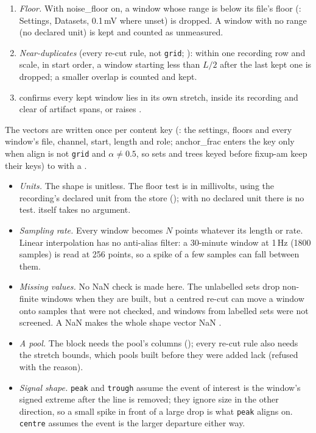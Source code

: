 \begin{enumerate}
  ): linear interpolation to $N$ points
  (, $N$ = resample\_length, default 256), then
  $z = (v - \bar v)/\sigma_v$ (; a flat window becomes all zeros).
\item \emph{Floor.} With noise\_floor on, a window whose range is below its file's floor
  (: Settings, Datasets, 0.1\,mV where unset) is dropped. A window with
  no range (no declared unit) is kept and counted as unmeasured.
\item \emph{Near-duplicates} (every re-cut rule, not \texttt{grid}; ): within one recording row
  and scale, in start order, a window starting less than $L/2$ after the last kept one is
  dropped; a smaller overlap is counted and kept.
\item {} confirms every kept window lies in its own stretch, inside its
  recording and clear of artifact spans, or raises .
\end{enumerate}
The vectors are written once per content key (: the settings, floors and
every window's file, channel, start, length and role; anchor\_frac enters the key only when
align is not \texttt{grid} and $\alpha \ne 0.5$, so sets and trees keyed before fixup-am keep
their keys) to
 with a .

\begin{itemize}
\item \emph{Units.} The shape is unitless. The floor test is in millivolts, using the
  recording's declared unit from the store (); with no declared unit
  there is no test.  itself takes no  argument.
\item \emph{Sampling rate.} Every window becomes $N$ points whatever its length or rate. Linear
  interpolation has no anti-alias filter: a 30-minute window at 1\,Hz (1800 samples) is read at
  256 points, so a spike of a few samples can fall between them.
\item \emph{Missing values.} No NaN check is made here. The unlabelled sets drop non-finite
  windows when they are built, but a centred re-cut can move a window onto samples that were
  not checked, and windows from labelled sets were not screened. A NaN makes the whole shape
  vector NaN .
\item \emph{A pool.} The block needs the pool's columns (); every re-cut rule also
  needs the stretch bounds, which pools built before they were added lack (refused with the
  reason).
\item \emph{Signal shape.} \texttt{peak} and \texttt{trough} assume the event of interest is the
  window's signed extreme after the line is removed; they ignore size in the other direction, so
  a small spike in front of a large drop is what \texttt{peak} aligns on.
  \texttt{centre} assumes the event is the larger departure either way.
\end{itemize}

